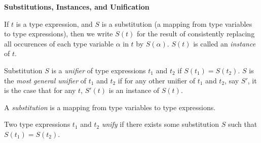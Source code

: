 \documentclass[12pt,a4paper,twoside,openany]{book}
\begin{document}
\begin{framed}
    \begin{center}
        \textbf{{\large Substitutions, Instances, and Unification}}
    \end{center}
    
    If $t$ is a type expression, and $S$ is a substitution (a mapping from type variables to type expressions), then we write $S(t)$ for the result of consistently replacing all occurences of each type variable $\alpha$ in $t$ by $S(\alpha)$. $S(t)$ is called an \textit{instance} of $t$.

    Substitution $S$ is a \textit{unifier} of type expressions $t_1$ and $t_2$ if $S(t_1)=S(t_2)$. $S$ is the \textit{most general unifier} of $t_1$ and $t_2$ if for any other unifier of $t_1$ and $t_2$, say $S'$, it is the case that for any $t$, $S'(t)$ is an instance of $S(t)$.
\end{framed}

A \textit{substitution} is a mapping from type variables to type expressions.

Two type expressions $t_1$ and $t_2$ \textit{unify} if there exists some substitution $S$ such that $S(t_1)=S(t_2)$.
\end{document}
